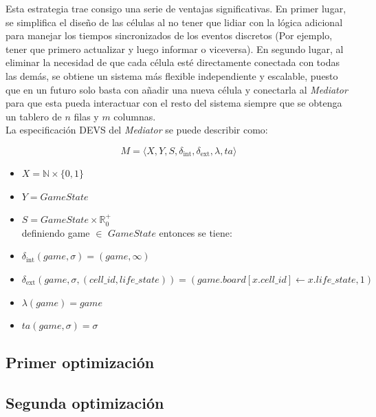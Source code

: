 \documentclass[]{article}
\newcommand{\dint}{\delta_{\text{int}}}
\newcommand{\dext}{\delta_{\text{ext}}}
\newcommand{\R}{\mathbb{R}}
\newcommand{\N}{\mathbb{N}}
\begin{document}
Esta estrategia trae consigo una serie de ventajas significativas. En primer lugar, se simplifica el diseño de las células al no tener que lidiar con la lógica adicional para manejar los tiempos sincronizados de los eventos discretos (Por ejemplo, tener que primero actualizar y luego informar o viceversa). En segundo lugar, al eliminar la necesidad de que cada célula esté directamente conectada con todas las demás, se obtiene un sistema más flexible independiente y escalable, puesto que en un futuro solo basta con añadir una nueva célula y conectarla al \textit{Mediator} para que esta pueda interactuar con el resto del sistema siempre que se obtenga un tablero de $n$ filas y $m$ columnas.\\

La especificación DEVS del \textit{Mediator} se puede describir como:

\[ M = \langle X, Y, S, \dint, \dext, \lambda, ta \rangle \]


\begin{itemize}
  \item $X = \N \times \{0,1\}$

  \item $Y = GameState$

  \item $S = GameState \times  \R_0^+$\\

        definiendo game $\in$ $GameState$ entonces se tiene:
  \item $\dint(game,\sigma) = (game,\infty)$

  \item $\dext(game, \sigma, (cell\_id, life\_state)) =
          (game.board[x.cell\_id] \leftarrow x.life\_state, 1)
        $


  \item $\lambda(game) = game $
  \item $ta(game,\sigma) = \sigma$
\end{itemize}


\subsection{Primer optimización}

\subsection{Segunda optimización}
\end{document}
